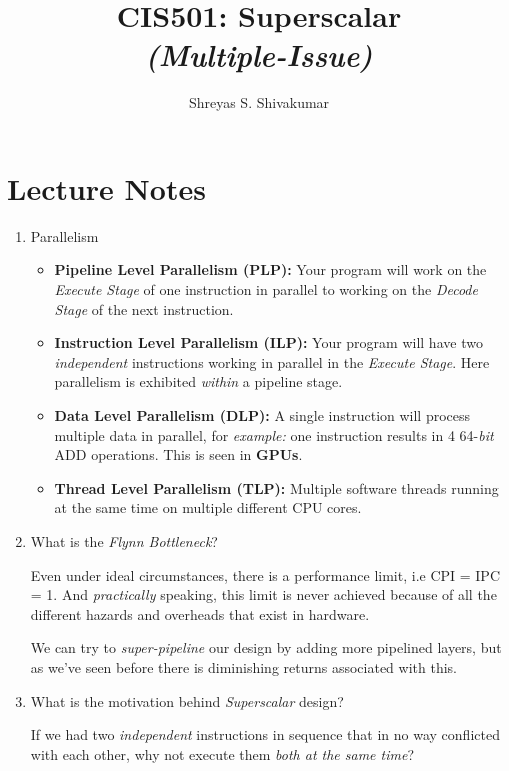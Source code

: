 \documentclass[12pt]{article}
\title{CIS501: Superscalar \\ \textit{(Multiple-Issue)}}
\author[1]{Shreyas S. Shivakumar}
\newenvironment{QandA}{\begin{enumerate}[label=\bfseries\arabic*.]\bfseries}
                      {\end{enumerate}}
\newenvironment{answered}{\par\quad\normalfont}{}
\begin{document}
\maketitle

\section{Lecture Notes}

\begin{QandA}
\item Parallelism
\begin{answered}
\vspace{-0.85cm}
\begin{itemize}
    \item \textbf{Pipeline Level Parallelism (PLP):} Your program will work on the \textit{Execute Stage} of one instruction in parallel to working on the \textit{Decode Stage} of the next instruction.
    \item \textbf{Instruction Level Parallelism (ILP):} Your program will have two \textit{independent} instructions working in parallel in the \textit{Execute Stage}. Here parallelism is exhibited \textit{within} a pipeline stage. 
    \item \textbf{Data Level Parallelism (DLP):} A single instruction will process multiple data in parallel, for \textit{example:} one instruction results in 4 64-\textit{bit} ADD operations. This is seen in \textbf{GPUs}.
    \item \textbf{Thread Level Parallelism (TLP):} Multiple software threads running at the same time on multiple different CPU cores. 
\end{itemize}
\end{answered}

\item What is the \textit{Flynn Bottleneck}?
\begin{answered}
Even under ideal circumstances, there is a performance limit, i.e CPI = IPC = 1. And \textit{practically} speaking, this limit is never achieved because of all the different hazards and overheads that exist in hardware. 

\quad We can try to \textit{super-pipeline} our design by adding more pipelined layers, but as we've seen before there is diminishing returns associated with this.
\end{answered}

\item What is the motivation behind \textit{Superscalar} design?
\begin{answered}
If we had two \textit{independent} instructions in sequence that in no way conflicted with each other, why not execute them \textit{both at the same time}?


\end{answered}
\end{QandA}
\end{document}
